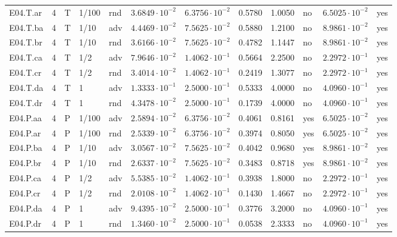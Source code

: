 {\begin{longtable}{@{}lllllllllll l@{}}
E04.T.ar & 4 & T & 1/100 & rnd & $3.6849\cdot 10^{-2}$ & $6.3756\cdot 10^{-2}$ & 0.5780 & 1.0050 & no & $6.5025\cdot 10^{-2}$ & yes \\
E04.T.ba & 4 & T & 1/10 & adv & $4.4469\cdot 10^{-2}$ & $7.5625\cdot 10^{-2}$ & 0.5880 & 1.2100 & no & $8.9861\cdot 10^{-2}$ & yes \\
E04.T.br & 4 & T & 1/10 & rnd & $3.6166\cdot 10^{-2}$ & $7.5625\cdot 10^{-2}$ & 0.4782 & 1.1447 & no & $8.9861\cdot 10^{-2}$ & yes \\
E04.T.ca & 4 & T & 1/2 & adv & $7.9646\cdot 10^{-2}$ & $1.4062\cdot 10^{-1}$ & 0.5664 & 2.2500 & no & $2.2972\cdot 10^{-1}$ & yes \\
E04.T.cr & 4 & T & 1/2 & rnd & $3.4014\cdot 10^{-2}$ & $1.4062\cdot 10^{-1}$ & 0.2419 & 1.3077 & no & $2.2972\cdot 10^{-1}$ & yes \\
E04.T.da & 4 & T & 1 & adv & $1.3333\cdot 10^{-1}$ & $2.5000\cdot 10^{-1}$ & 0.5333 & 4.0000 & no & $4.0960\cdot 10^{-1}$ & yes \\
E04.T.dr & 4 & T & 1 & rnd & $4.3478\cdot 10^{-2}$ & $2.5000\cdot 10^{-1}$ & 0.1739 & 4.0000 & no & $4.0960\cdot 10^{-1}$ & yes \\
E04.P.aa & 4 & P & 1/100 & adv & $2.5894\cdot 10^{-2}$ & $6.3756\cdot 10^{-2}$ & 0.4061 & 0.8161 & yes & $6.5025\cdot 10^{-2}$ & yes \\
E04.P.ar & 4 & P & 1/100 & rnd & $2.5339\cdot 10^{-2}$ & $6.3756\cdot 10^{-2}$ & 0.3974 & 0.8050 & yes & $6.5025\cdot 10^{-2}$ & yes \\
E04.P.ba & 4 & P & 1/10 & adv & $3.0567\cdot 10^{-2}$ & $7.5625\cdot 10^{-2}$ & 0.4042 & 0.9680 & yes & $8.9861\cdot 10^{-2}$ & yes \\
E04.P.br & 4 & P & 1/10 & rnd & $2.6337\cdot 10^{-2}$ & $7.5625\cdot 10^{-2}$ & 0.3483 & 0.8718 & yes & $8.9861\cdot 10^{-2}$ & yes \\
E04.P.ca & 4 & P & 1/2 & adv & $5.5385\cdot 10^{-2}$ & $1.4062\cdot 10^{-1}$ & 0.3938 & 1.8000 & no & $2.2972\cdot 10^{-1}$ & yes \\
E04.P.cr & 4 & P & 1/2 & rnd & $2.0108\cdot 10^{-2}$ & $1.4062\cdot 10^{-1}$ & 0.1430 & 1.4667 & no & $2.2972\cdot 10^{-1}$ & yes \\
E04.P.da & 4 & P & 1 & adv & $9.4395\cdot 10^{-2}$ & $2.5000\cdot 10^{-1}$ & 0.3776 & 3.2000 & no & $4.0960\cdot 10^{-1}$ & yes \\
E04.P.dr & 4 & P & 1 & rnd & $1.3460\cdot 10^{-2}$ & $2.5000\cdot 10^{-1}$ & 0.0538 & 2.3333 & no & $4.0960\cdot 10^{-1}$ & yes \\

\end{longtable}}
